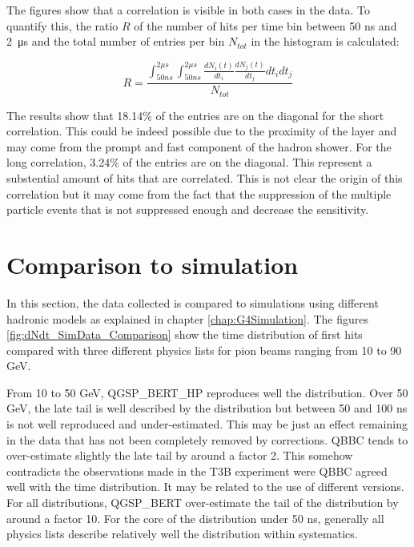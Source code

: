 The figures show that a correlation is visible in both cases in the data. To quantify this, the ratio $R$ of the number of hits per time bin between 50 ns and \SI{2}{\micro\second} and the total number of entries per bin $N_{tot}$ in the histogram is calculated:

\begin{equation}
	R = \frac{\int_{50 ns}^{2 \mu s} \int_{50 ns}^{2 \mu s} \frac{dN_i(t)}{dt_i} \frac{dN_j(t)}{dt_j} dt_i dt_j}{N_{tot}}
\end{equation}

The results show that 18.14\% of the entries are on the diagonal for the short correlation. This could be indeed possible due to the proximity of the layer and may come from the prompt and fast component of the hadron shower. For the long correlation, 3.24\% of the entries are on the diagonal. This represent a substential amount of hits that are correlated. This is not clear the origin of this correlation but it may come from the fact that the suppression of the multiple particle events that is not suppressed enough and decrease the sensitivity.

\section{Comparison to simulation}

In this section, the data collected is compared to \geant simulations using different hadronic models as explained in chapter \ref{chap:G4Simulation}. The figures \ref{fig:dNdt_SimData_Comparison} show the time distribution of first hits compared with three different physics lists for pion beams ranging from 10 to 90 GeV.

From 10 to 50 GeV, QGSP\_BERT\_HP reproduces well the distribution. Over 50 GeV, the late tail is well described by the distribution but between 50 and 100 ns is not well reproduced and under-estimated. This may be just an effect remaining in the data that has not been completely removed by corrections. QBBC tends to over-estimate slightly the late tail by around a factor 2. This somehow contradicts the observations made in the T3B experiment were QBBC agreed well with the time distribution. It may be related to the use of different \geant versions. For all distributions, QGSP\_BERT over-estimate the tail of the distribution by around a factor 10. For the core of the distribution under 50 ns, generally all physics lists describe relatively well the distribution within systematics.

